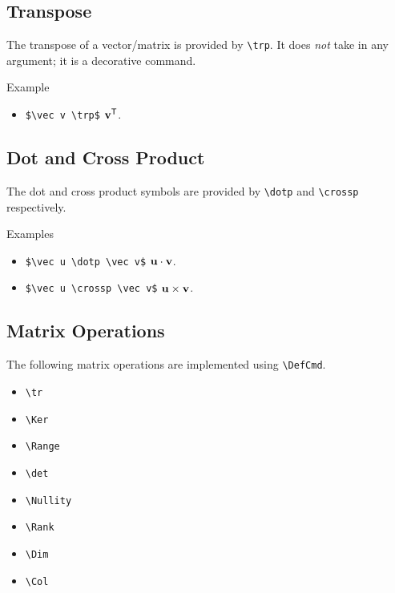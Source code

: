 
\subsection{Transpose}

The transpose of a vector/matrix is provided by \verb|\trp|. It does \emph{not} take in any argument; it is a decorative command.

\begin{myframe}{Example}
    \begin{itemize}
        \item \verb|$\vec v \trp$| \produces{} $\mathbf{v} ^{\mathsf{T}}$.
    \end{itemize}
\end{myframe}

\subsection{Dot and Cross Product}

The dot and cross product symbols are provided by \verb|\dotp| and \verb|\crossp| respectively.

\begin{myframe}{Examples}
    \begin{itemize}
        \item \verb|$\vec u \dotp \vec v$| \produces{} $\mathbf{u} \cdot \mathbf{v}$.
        \item \verb|$\vec u \crossp \vec v$| \produces{} $\mathbf{u} \times \mathbf{v}$.
    \end{itemize}
\end{myframe}

\subsection{Matrix Operations}

The following matrix operations are implemented using \verb|\DefCmd|.

\begin{multicols}{3}
    \begin{itemize}
        \item \verb|\tr|
        \item \verb|\Ker|
        \item \verb|\Range|
        \item \verb|\det|
        \item \verb|\Nullity|
        \item \verb|\Rank|
        \item \verb|\Dim|
        \item \verb|\Col|
    \end{itemize}
\end{multicols}

